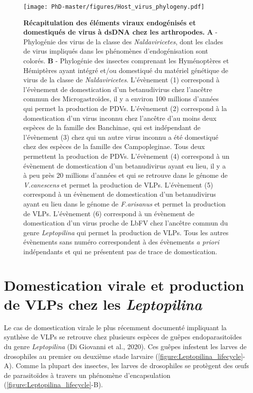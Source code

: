 \begin{figure}[H]
\captionsetup{font=footnotesize}
 \centering
  \texttt{[image: PhD-master/figures/Host\_virus\_phylogeny.pdf]}
\caption[Intro:Distribution des EVEs et EVEs domestiqués de virus à dsDNA chez les arthropodes]{\textbf{Récapitulation des éléments viraux endogénisés et domestiqués de virus à dsDNA chez les arthropodes.} \textbf{A} - Phylogénie des virus de la classe des \textit{Naldaviricetes}, dont les clades de virus impliqués dans les phénomènes d'endogénisation sont colorés. \textbf{B} - Phylogénie des insectes comprenant les Hyménoptères et Hémiptères ayant intégré et/ou domestiqué du matériel génétique de virus de la classe de \textit{Naldaviricetes}. L'évènement (1) correspond à l'évènement de domestication d'un betanudivirus chez l'ancêtre commun des Microgastroïdes, il y a environ 100 millions d'années qui permet la production de PDVs. L'évènement (2) correspond à la domestication d'un virus inconnu chez l'ancêtre d'au moins deux espèces de la famille des Banchinae, qui est indépendant de l'évènement (3) chez qui un autre virus inconnu a été domestiqué chez des espèces de la famille des Campopleginae. Tous deux permettent la production de PDVs. L'évènement (4) correspond à un évènement de domestication d'un betanudivirus ayant eu lieu, il y a à peu près 20 millions d'années et qui se retrouve dans le génome de \textit{V.canescens} et permet la production de VLPs. L'évènement (5) correspond à un évènement de domestication d'un betanudivirus ayant eu lieu dans le génome de \textit{F.arisanus} et permet la production de VLPs. L'évènement (6) correspond à un évènement de domestication d'un virus proche de LbFV chez l'ancêtre commun du genre \textit{Leptopilina} qui permet la production de VLPs. Tous les autres évènements sans numéro correspondent à des évènements \textit{a priori} indépendants et qui ne présentent pas de trace de domestication.}
\label{figure:Virus_arthropods_phylogeny}
\end{figure}


\section{Domestication virale et production de VLPs chez les \textit{Leptopilina}}

Le cas de domestication virale le plus récemment documenté impliquant la synthèse de VLPs se retrouve chez plusieurs espèces de guêpes endoparasitoïdes du genre \textit{Leptopilina} (Di Giovanni et al., 2020). Ces guêpes infestent les larves de drosophiles au premier ou deuxième stade larvaire (\figurename{\ref{figure:Leptopilina_lifecycle}}-A). Comme la plupart des insectes, les larves de drosophiles se protègent des œufs de parasitoïdes à travers un phénomène d'encapsulation (\figurename{\ref{figure:Leptopilina_lifecycle}}-B). \\


